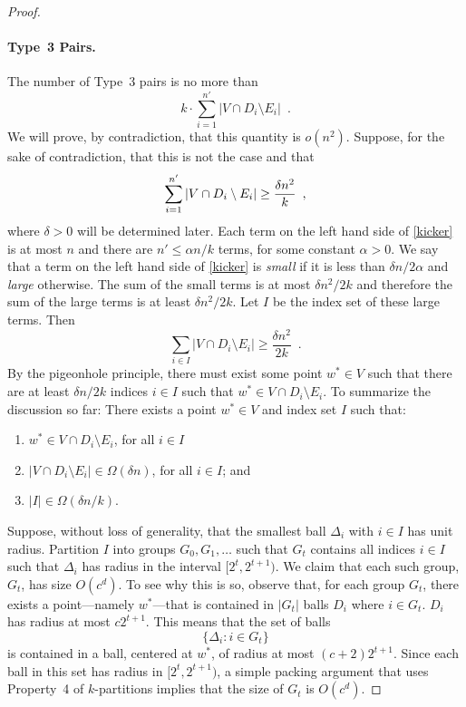 \documentclass{patmorin}
\begin{document}
\begin{proof}
  \paragraph{Type~3 Pairs.}
  The number of Type~3 pairs is no more than 
  \[  
     k\cdot\sum_{i=1}^{n'}|V\cap D_i\setminus E_i| \enspace .
  \]
  We will prove, by contradiction, that this quantity is $o(n^2)$.
  Suppose, for the sake of contradiction, that this is not the case
  and that
  \begin{equation}
    \sum_{i=1}^{n'} |V\cap D_i\setminus E_i| \ge \frac{\delta n^2}{k}
         \enspace , \eqlabel{kicker}
  \end{equation}
  where $\delta>0$ will be determined later.
  Each term on the left hand side of \eqref{kicker} is at most $n$
  and there are $n'\le \alpha n/k$ terms, for some constant $\alpha
  >0$.  We say that a term on the left hand side of \eqref{kicker} is
  \emph{small} if it is less than $\delta n/2\alpha$ and \emph{large}
  otherwise.  The sum of the small terms is at most $\delta n^2/2k$
  and therefore the sum of the large terms is at least $\delta n^2/2k$.
  Let $I$ be the index set of these large terms.  Then
  \[
    \sum_{i\in I} |V\cap D_i\setminus E_i| \ge \frac{\delta n^2}{2k} \enspace .
  \]
  By the pigeonhole principle, there must exist some point $w^*\in V$
  such that there are at least $\delta n/2k$ indices $i\in I$ such that
  $w^*\in V\cap D_i\setminus E_i$.  To summarize the discussion so far:
  There exists a point $w^*\in V$ and index set $I$
  such that:
  \begin{enumerate}
     \item $w^*\in V\cap D_{i}\setminus E_{i}$, for all
        $i\in I$
     \item $|V\cap D_{i}\setminus E_{i}|\in \Omega(\delta n)$,
       for all $i\in I$; and
     \item $|I|\in\Omega(\delta n/k)$.
  \end{enumerate}

  Suppose, without loss of generality, that the smallest ball
  $\Delta_i$ with $i\in I$ has unit radius.  Partition $I$ into groups
  $G_0,G_1,\ldots$ such that $G_t$ contains all indices $i\in I$ such
  that $\Delta_{i}$ has radius in the interval $[2^t,2^{t+1})$.  We claim
  that each such group, $G_t$, has size $O(c^d)$.  To see why this is
  so, observe that, for each group $G_t$, there exists a point---namely
  $w^*$---that is contained in $|G_t|$ balls $D_{i}$ where $i\in G_t$.
  $D_{i}$ has radius at most $c2^{t+1}$.  This means that the set of balls
  \[
     \{ \Delta_i : i\in G_t\}
  \]
  is contained in a ball, centered at $w^*$, of radius at most
  $(c+2)2^{t+1}$.  Since each ball in this set has radius in
  $[2^t,2^{t+1})$, a simple packing argument that uses Property~4 of
  $k$-partitions implies that the size of $G_t$ is $O(c^d)$.


\end{proof}
\end{document}
